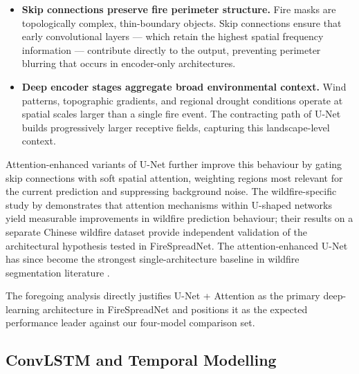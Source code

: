 \begin{itemize}
    \item \textbf{Skip connections preserve fire perimeter structure.}
          Fire masks are topologically complex, thin-boundary objects.
          Skip connections ensure that early convolutional layers — which retain the highest spatial frequency information — contribute directly to the output, preventing perimeter blurring that occurs in encoder-only architectures.

    \item \textbf{Deep encoder stages aggregate broad environmental context.}
          Wind patterns, topographic gradients, and regional drought conditions operate at spatial scales larger than a single fire event.
          The contracting path of U-Net builds progressively larger receptive fields, capturing this landscape-level context.
\end{itemize}

Attention-enhanced variants of U-Net \citep{oktay2018attention} further improve this behaviour by gating skip connections with soft spatial attention, weighting regions most relevant for the current prediction and suppressing background noise.
The wildfire-specific study by \citet{xiao2024u2net} demonstrates that attention mechanisms within U-shaped networks yield measurable improvements in wildfire prediction behaviour; their results on a separate Chinese wildfire dataset provide independent validation of the architectural hypothesis tested in FireSpreadNet.
The attention-enhanced U-Net has since become the strongest single-architecture baseline in wildfire segmentation literature \citep{fitzgerald2023attention}.


The foregoing analysis directly justifies U-Net + Attention as the primary deep-learning architecture in FireSpreadNet and positions it as the expected performance leader against our four-model comparison set.

\subsection{ConvLSTM and Temporal Modelling}
\label{sec:sota_convlstm}

